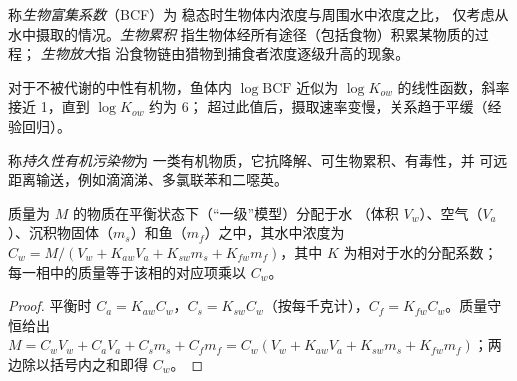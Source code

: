 \begin{definition}[生物累积]\label{def:b3:environmental-toxicology:bio}
称\emph{生物富集系数}（BCF）为
稳态时生物体内浓度与周围水中浓度之比，
仅考虑从水中摄取的情况。\emph{生物累积}
指生物体经所有途径（包括食物）积累某物质的过程；
\emph{生物放大}指
沿食物链由猎物到捕食者浓度逐级升高的现象。
\end{definition}

\begin{proposition}[BCF 与 $K_{ow}$]\label{prop:b3:environmental-toxicology:bcf-kow}
对于不被代谢的中性有机物，鱼体内 $\log\mathrm{BCF}$ 近似为
$\log K_{ow}$ 的线性函数，斜率接近 1，直到 $\log K_{ow}$ 约为 6；
超过此值后，摄取速率变慢，关系趋于平缓（经验回归）。
\admitted
\end{proposition}

\begin{definition}[持久性有机污染物]\label{def:b3:environmental-toxicology:pop}
称\emph{持久性有机污染物}为
一类有机物质，它抗降解、可生物累积、有毒性，并
可远距离输送，例如滴滴涕、多氯联苯和二噁英。
\end{definition}

\begin{proposition}[平衡状态下各相之间的分配]\label{prop:b3:environmental-toxicology:level-one}
质量为 $M$ 的物质在平衡状态下（“一级”模型）分配于水
（体积 $V_w$）、空气（$V_a$）、沉积物固体（$m_s$）和鱼（$m_f$）之中，其水中浓度为
$C_w = M/(V_w + K_{aw}V_a + K_{sw}m_s + K_{fw}m_f)$，其中 $K$ 为相对于水的分配系数；
每一相中的质量等于该相的对应项乘以 $C_w$。
\end{proposition}

\begin{proof}
平衡时 $C_a = K_{aw}C_w$，$C_s = K_{sw}C_w$（按每千克计），$C_f = K_{fw}C_w$。质量守恒给出
$M = C_wV_w + C_aV_a + C_sm_s + C_fm_f = C_w(V_w + K_{aw}V_a + K_{sw}m_s + K_{fw}m_f)$；两边除以括号内之和即得 $C_w$。
\end{proof}

